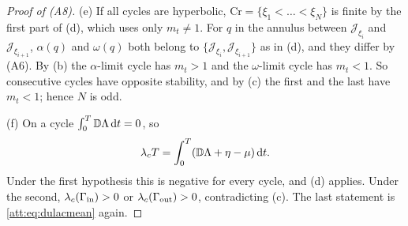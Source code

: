 \begin{proof}[Proof of (A8)]
(e) If all cycles are hyperbolic, $\mathrm{Cr}=\{\xi_1<\dots<\xi_N\}$ is finite by the first part of (d), which uses only $m_t\ne1$. For $q$ in the annulus between $\mathcal J_{\xi_i}$ and $\mathcal J_{\xi_{i+1}}$, $\alpha(q)$ and $\omega(q)$ both belong to $\{\mathcal J_{\xi_i},\mathcal J_{\xi_{i+1}}\}$ as in (d), and they differ by (A6). By (b) the $\alpha$-limit cycle has $m_t>1$ and the $\omega$-limit cycle has $m_t<1$. So consecutive cycles have opposite stability, and by (c) the first and the last have $m_t<1$; hence $N$ is odd.

(f) On a cycle $\int_0^T\mathbb D\Lambda\,\mathrm dt=0$, so
\begin{equation}\label{att:eq:dulacmean}
\lambda_cT=\int_0^T(\mathbb D\Lambda+\eta-\mu)\,\mathrm dt .
\end{equation}
Under the first hypothesis this is negative for every cycle, and (d) applies. Under the second, $\lambda_c(\Gamma_{\rm in})>0$ or $\lambda_c(\Gamma_{\rm out})>0$, contradicting (c). The last statement is \eqref{att:eq:dulacmean} again.
\end{proof}

